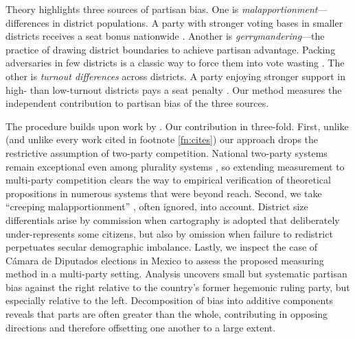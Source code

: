 \documentclass[letter,12pt]{article}
\begin{document}
Theory highlights three sources of partisan bias. One is \emph{malapportionment}---differences in district populations. A party with stronger voting bases in smaller districts receives a seat bonus nationwide \citep{johnston.2002,jackmanMeasuringBias1994}. Another is \emph{gerrymandering}---the practice of drawing district boundaries to achieve partisan advantage. Packing adversaries in few districts is a classic way to force them into vote wasting \citep{cox.katz.2002,engstrom2006redisttrictApsr}. The other is \emph{turnout differences} across districts. A party enjoying stronger support in high- than low-turnout districts pays a seat penalty \citep{campbellTurnoutBias1996,rosenstone.hansen.1993}. Our method measures the independent contribution to partisan bias of the three sources. 

The procedure builds upon work by \citet{grofman.etalBiasMalapp.1997}. Our contribution in three-fold. First, unlike \citeauthor{grofman.etalBiasMalapp.1997} (and unlike every work cited in footnote \ref{fn:cites}) our approach drops the restrictive assumption of two-party competition. National two-party systems remain exceptional even among plurality systems \citep{cox.1997}, so extending measurement to multi-party competition clears the way to empirical verification of theoretical propositions in numerous systems that were beyond reach. Second, we take ``creeping malapportionment'' \citep{johnston.2002}, often ignored, into account. District size differentials arise by commission when cartography is adopted that deliberately under-represents some citizens, but also by omission when failure to redistrict perpetuates secular demographic imbalance. Lastly, we inspect the case of C\'amara de Diputados elections in Mexico to assess the proposed measuring method in a multi-party setting. Analysis uncovers small but systematic partisan bias against the right relative to the country's former hegemonic ruling party, but especially relative to the left. Decomposition of bias into additive components reveals that parts are often greater than the whole, contributing in opposing directions and therefore offsetting one another to a large extent. 
\end{document}
